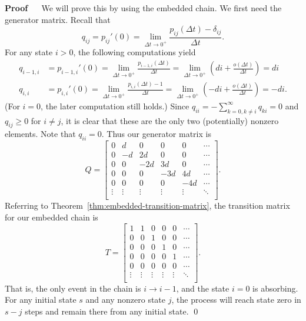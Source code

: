 \documentclass[12pt]{article}
\renewenvironment{proof}{%
\begin{adjustwidth}{\parindent}{\parindent}
{\bf Proof} \ \ 
}{\qed
\end{adjustwidth}}
\theoremstyle{definition}
\begin{document}
\begin{proof}
We will prove this by using the embedded chain. We first need the generator
matrix. Recall that $$q_{ij} = p_{ij}'(0) = \lim_{\Delta t \to 0^+}
\frac{p_{ij}(\Delta t) - \delta_{ij}}{\Delta t}.$$ For any state $i > 0$, the
following computations yield
\begin{align*}
    q_{i - 1, i} &= p_{i - 1, i}'(0)
        = \lim_{\Delta t \to 0^+} \frac{p_{i - 1, i}(\Delta t)}{\Delta t}
        = \lim_{\Delta t \to 0^+}
            \left( di + \frac{o(\Delta t)}{\Delta t} \right) = di \\
%
    q_{i, i} &= p_{i, i}'(0)
        = \lim_{\Delta t \to 0^+} \frac{p_{i, i}(\Delta t) - 1}{\Delta t}
        = \lim_{\Delta t \to 0^+}
            \left( -di + \frac{o(\Delta t)}{\Delta t} \right) = -di.
\end{align*}
(For $i = 0$, the later computation still holds.) Since $q_{ii} = -\sum_{k = 0,
k \neq i}^\infty q_{ki} = 0$ and $q_{ij} \geq 0$ for $i \neq j$, it is clear
that these are the only two (potentially) nonzero elements. Note that $q_{ii} =
0$. Thus our generator matrix is
\begin{equation*}
    Q =
    \begin{bmatrix}
        0 & d & 0 & 0 & 0 & \cdots \\
        0 & -d & 2d & 0 & 0 & \cdots \\
        0 & 0 & -2d & 3d & 0 & \cdots \\
        0 & 0 & 0 & -3d & 4d & \cdots \\
        0 & 0 & 0 & 0 & -4d & \cdots \\
        \vdots & \vdots & \vdots & \vdots & \vdots & \ddots \\
    \end{bmatrix}.
\end{equation*}
Referring to Theorem~\ref{thm:embedded-transition-matrix}, the transition
matrix for our embedded chain is
\begin{equation*}
    T =
    \begin{bmatrix}
        1 & 1 & 0 & 0 & 0 & \cdots \\
        0 & 0 & 1 & 0 & 0 & \cdots \\
        0 & 0 & 0 & 1 & 0 & \cdots \\
        0 & 0 & 0 & 0 & 1 & \cdots \\
        0 & 0 & 0 & 0 & 0 & \cdots \\
        \vdots & \vdots & \vdots & \vdots & \vdots & \ddots \\
    \end{bmatrix}.
\end{equation*}
That is, the only event in the chain is $i \to i - 1$, and the state $i = 0$ is
absorbing. For any initial state $s$ and any nonzero state $j$, the process
will reach state zero in $s - j$ steps and remain there from any initial state.
\end{proof}
\end{document}
